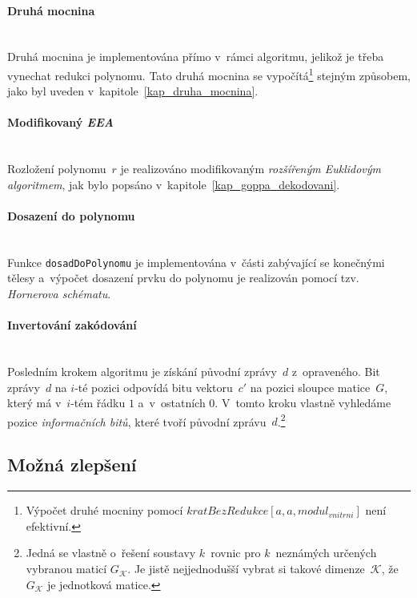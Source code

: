 \documentclass[thesis=M,czech,hidelinks]{FITthesis}[2012/06/26]
\newcommand{\0}{{\textcolor[gray]{0.75}{0}}}
\begin{document}
\vfill

\paragraph{Druhá mocnina} \hfil \\
Druhá mocnina je implementována přímo v~rámci algoritmu, jelikož je třeba
vynechat redukci polynomu. Tato druhá mocnina se vypočítá\footnote{
    Výpočet druhé mocniny pomocí $ kratBezRedukce[ a, a, modul_{vnitrni} ] $ není
    efektivní.
} stejným způsobem, jako byl uveden v~kapitole~\ref{kap_druha_mocnina}.


\paragraph{Modifikovaný \emph{EEA}} \hfil \\
Rozložení polynomu~$r$ je realizováno modifikovaným \emph{rozšířeným Euklidovým
algoritmem}, jak bylo popsáno v~kapitole~\ref{kap_goppa_dekodovani}.


\paragraph{Dosazení do polynomu} \hfil \\
Funkce \texttt{dosadDoPolynomu} je implementována v~části zabývající se
konečnými tělesy a~výpočet dosazení prvku do polynomu je realizován pomocí tzv.
\emph{Hornerova schématu}.

\paragraph{Invertování zakódování} \hfil \\
Posledním krokem algoritmu je získání původní zprávy~$d$ z~opraveného.
Bit zprávy~$d$ na $i$-té pozici odpovídá bitu vektoru~$c'$ na pozici sloupce
matice~$G$, který má v~$i$-tém řádku $1$ a~v~ostatních $0$. V~tomto kroku
vlastně vyhledáme pozice \emph{informačních bitů}, které tvoří původní
zprávu~$d$.\footnote{
    Jedná se vlastně o~řešení soustavy $k$~rovnic pro $k$~neznámých určených
    vybranou maticí $G_\mathcal{K}$. Je jistě nejjednodušší vybrat si takové
    dimenze~$\mathcal{K}$, že~$G_\mathcal{K}$ je jednotková matice.
}


\subsection{Možná zlepšení}
\end{document}
